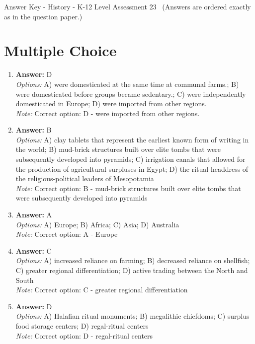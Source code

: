 \documentclass[12pt]{article}
\begin{document}
\begin{center}
Answer Key - History - K-12 Level Assessment 23 \
\small (Answers are ordered exactly as in the question paper.)
\end{center}

\section*{Multiple Choice}
\begin{enumerate}[label=\arabic*.]
\item \textbf{Answer:} D
\\ \textit{Options:} A) were domesticated at the same time at communal farms.; B) were domesticated before groups became sedentary.; C) were independently domesticated in Europe; D) were imported from other regions.
\\ \textit{Note:} Correct option: D - were imported from other regions.
\item \textbf{Answer:} B
\\ \textit{Options:} A) clay tablets that represent the earliest known form of writing in the world; B) mud-brick structures built over elite tombs that were subsequently developed into pyramids; C) irrigation canals that allowed for the production of agricultural surpluses in Egypt; D) the ritual headdress of the religious-political leaders of Mesopotamia
\\ \textit{Note:} Correct option: B - mud-brick structures built over elite tombs that were subsequently developed into pyramids
\item \textbf{Answer:} A
\\ \textit{Options:} A) Europe; B) Africa; C) Asia; D) Australia
\\ \textit{Note:} Correct option: A - Europe
\item \textbf{Answer:} C
\\ \textit{Options:} A) increased reliance on farming; B) decreased reliance on shellfish; C) greater regional differentiation; D) active trading between the North and South
\\ \textit{Note:} Correct option: C - greater regional differentiation
\item \textbf{Answer:} D
\\ \textit{Options:} A) Halafian ritual monuments; B) megalithic chiefdoms; C) surplus food storage centers; D) regal-ritual centers
\\ \textit{Note:} Correct option: D - regal-ritual centers
\end{enumerate}
\end{document}
